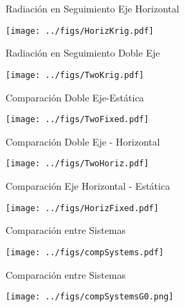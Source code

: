\documentclass[aspectratio=169, usenames,svgnames,dvipsnames]{beamer}
\begin{document}
\begin{frame}[label={sec:org01ff6ad}]{Radiación en Seguimiento Eje Horizontal}
\begin{center}
\texttt{[image: ../figs/HorizKrig.pdf]}
\end{center}
\end{frame}



\begin{frame}[label={sec:orgd562b2a}]{Radiación en Seguimiento Doble Eje}
\begin{center}
\texttt{[image: ../figs/TwoKrig.pdf]}
\end{center}
\end{frame}


\begin{frame}[label={sec:org52c63fc}]{Comparación Doble Eje-Estática}
\begin{center}
\texttt{[image: ../figs/TwoFixed.pdf]}
\end{center}
\end{frame}



\begin{frame}[label={sec:org144f04a}]{Comparación Doble Eje - Horizontal}
\begin{center}
\texttt{[image: ../figs/TwoHoriz.pdf]}
\end{center}
\end{frame}



\begin{frame}[label={sec:orgf21b12c}]{Comparación Eje Horizontal - Estática}
\begin{center}
\texttt{[image: ../figs/HorizFixed.pdf]}
\end{center}
\end{frame}



\begin{frame}[label={sec:orgec352d2}]{Comparación entre Sistemas}
\begin{center}
\texttt{[image: ../figs/compSystems.pdf]}
\end{center}
\end{frame}

\begin{frame}[label={sec:org07e02f0}]{Comparación entre Sistemas}
\begin{center}
\texttt{[image: ../figs/compSystemsG0.png]}
\end{center}
\end{frame}
\end{document}
